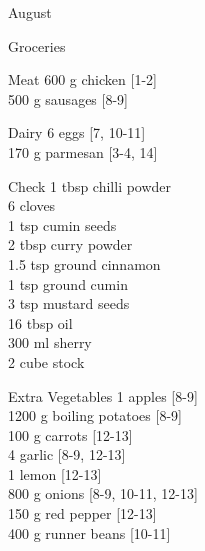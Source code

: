 \begin{menu}{August}
\begin{shoppinglist}{Groceries}
      \end{shoppinglist}%
      \par\vfil %
      \begin{shoppinglist}{Meat}
      600 g chicken {\scriptsize[1-2]}\\
      500 g sausages {\scriptsize[8-9]}\\
      \end{shoppinglist}%
      \begin{shoppinglist}{Dairy}
      6  eggs {\scriptsize[7, 10-11]}\\
      170 g parmesan {\scriptsize[3-4, 14]}\\
      \end{shoppinglist}%
      \par\vfil %
      \vfil\clearpage %
      \begin{shoppinglist}{Check}
      1 tbsp chilli powder \\
      6  cloves \\
      1 tsp cumin seeds \\
      2 tbsp curry powder \\
      1.5 tsp ground cinnamon \\
      1 tsp ground cumin \\
      3 tsp mustard seeds \\
      16 tbsp oil \\
      300 ml sherry \\
      2 cube stock \\
      \end{shoppinglist}%
      \begin{shoppinglist}{Extra Vegetables}
      1  apples {\scriptsize[8-9]}\\
      1200 g boiling potatoes {\scriptsize[8-9]}\\
      100 g carrots {\scriptsize[12-13]}\\
      4  garlic {\scriptsize[8-9, 12-13]}\\
      1  lemon {\scriptsize[12-13]}\\
      800 g onions {\scriptsize[8-9, 10-11, 12-13]}\\
      150 g red pepper {\scriptsize[12-13]}\\
      400 g runner beans {\scriptsize[10-11]}\\
      \end{shoppinglist}%
      \par\vfil %
    \vfil\clearpage
  

\end{menu}
